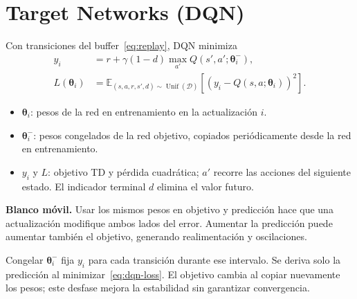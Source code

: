 \section{Target Networks (DQN)}
Con transiciones del buffer~\eqref{eq:replay}, DQN minimiza~\cite{mnih2015}
\begin{equation}\label{eq:dqn-loss}
\begin{aligned}
    y_i&=r+\gamma(1-d)\max_{a'}Q(s',a';\boldsymbol{\theta}_i^{-}),\\
    L(\boldsymbol{\theta}_i)&=
    \mathbb{E}_{(s,a,r,s',d)\sim\operatorname{Unif}(\mathcal{D})}
    \left[(y_i-Q(s,a;\boldsymbol{\theta}_i))^2\right].
\end{aligned}
\end{equation}
\begin{itemize}
    \item $\boldsymbol{\theta}_i$: pesos de la red en entrenamiento en la actualización $i$.
    \item $\boldsymbol{\theta}_i^{-}$: pesos congelados de la red objetivo, copiados periódicamente desde la red en entrenamiento.
    \item $y_i$ y $L$: objetivo TD y pérdida cuadrática; $a'$ recorre las acciones del siguiente estado. El indicador terminal $d$ elimina el valor futuro.
\end{itemize}

\textbf{Blanco móvil.} Usar los mismos pesos en objetivo y predicción hace que una actualización modifique ambos lados del error. Aumentar la predicción puede aumentar también el objetivo, generando realimentación y oscilaciones.

Congelar $\boldsymbol{\theta}_i^{-}$ fija $y_i$ para cada transición durante ese intervalo. Se deriva solo la predicción al minimizar~\eqref{eq:dqn-loss}. El objetivo cambia al copiar nuevamente los pesos; este desfase mejora la estabilidad sin garantizar convergencia.
